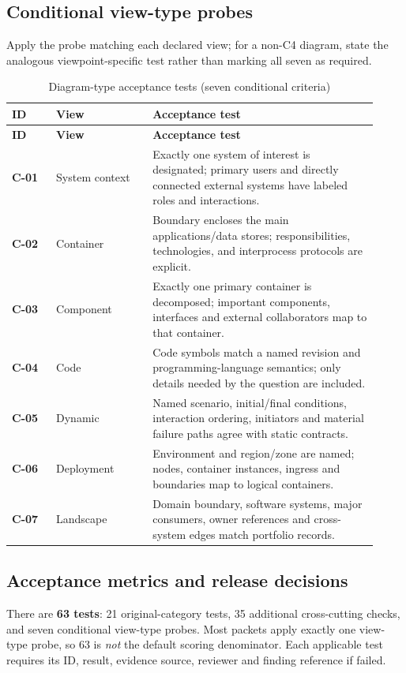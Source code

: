 \documentclass[10pt,letterpaper]{article}
\begin{document}
\subsection{Conditional view-type probes}
Apply the probe matching each declared view; for a non-C4 diagram, state the analogous viewpoint-specific test rather than marking all seven as required.
\begin{longtable}{@{}>{\raggedright\arraybackslash}p{0.11\linewidth}>{\raggedright\arraybackslash}p{0.24\linewidth}>{\raggedright\arraybackslash}p{0.57\linewidth}@{}}
\caption{Diagram-type acceptance tests (seven conditional criteria)}\label{tab:review-C}\\
\toprule\textbf{ID} & \textbf{View} & \textbf{Acceptance test}\\\midrule\endfirsthead
\toprule\textbf{ID} & \textbf{View} & \textbf{Acceptance test}\\\midrule\endhead
\bottomrule\endlastfoot
\textbf{\textsf{C-01}} & System context & Exactly one system of interest is designated; primary users and directly connected external systems have labeled roles and interactions.\\[3pt]
\textbf{\textsf{C-02}} & Container & Boundary encloses the main applications/data stores; responsibilities, technologies, and interprocess protocols are explicit.\\[3pt]
\textbf{\textsf{C-03}} & Component & Exactly one primary container is decomposed; important components, interfaces and external collaborators map to that container.\\[3pt]
\textbf{\textsf{C-04}} & Code & Code symbols match a named revision and programming-language semantics; only details needed by the question are included.\\[3pt]
\textbf{\textsf{C-05}} & Dynamic & Named scenario, initial/final conditions, interaction ordering, initiators and material failure paths agree with static contracts.\\[3pt]
\textbf{\textsf{C-06}} & Deployment & Environment and region/zone are named; nodes, container instances, ingress and boundaries map to logical containers.\\[3pt]
\textbf{\textsf{C-07}} & Landscape & Domain boundary, software systems, major consumers, owner references and cross-system edges match portfolio records.\\[3pt]
\end{longtable}

\subsection{Acceptance metrics and release decisions}
\label{sec:review-acceptance}
There are \textbf{63 tests}: 21 original-category tests, 35 additional cross-cutting checks, and seven conditional view-type probes. Most packets apply exactly one view-type probe, so 63 is \emph{not} the default scoring denominator. Each applicable test requires its ID, result, evidence source, reviewer and finding reference if failed.
\end{document}

